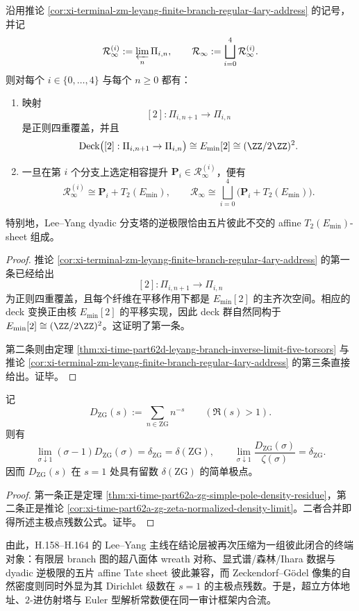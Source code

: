 \begin{theorem}\label{thm:xi-time-part62dh-leyang-branch-affine-tate-regular-cover}
沿用推论 \ref{cor:xi-terminal-zm-leyang-finite-branch-regular-4ary-address} 的记号，并记
\[
\mathcal R_\infty^{(i)}:=\varprojlim_n\Pi_{i,n},
\qquad
\mathcal R_\infty:=\bigsqcup_{i=0}^{4}\mathcal R_\infty^{(i)}.
\]
则对每个 \(i\in\{0,\dots,4\}\) 与每个 \(n\ge 0\) 都有：
\begin{enumerate}
  \item 映射
  \[
  [2]:\Pi_{i,n+1}\longrightarrow \Pi_{i,n}
  \]
  是正则四重覆盖，并且
  \[
  \operatorname{Deck}\bigl([2]:\Pi_{i,n+1}\to \Pi_{i,n}\bigr)
  \cong
  E_{\min}[2]
  \cong
  (\ZZ/2\ZZ)^2.
  \]
  \item 一旦在第 \(i\) 个分支上选定相容提升 \(\mathbf P_i\in\mathcal R_\infty^{(i)}\)，便有
  \[
  \mathcal R_\infty^{(i)}\cong \mathbf P_i+T_2(E_{\min}),
  \qquad
  \mathcal R_\infty
  \cong
  \bigsqcup_{i=0}^{4}\bigl(\mathbf P_i+T_2(E_{\min})\bigr).
  \]
\end{enumerate}
特别地，Lee--Yang dyadic 分支塔的逆极限恰由五片彼此不交的 affine \(T_2(E_{\min})\)-sheet 组成。
\end{theorem}
\begin{proof}
推论 \ref{cor:xi-terminal-zm-leyang-finite-branch-regular-4ary-address} 的第一条已经给出
\[
[2]:\Pi_{i,n+1}\to\Pi_{i,n}
\]
为正则四重覆盖，且每个纤维在平移作用下都是 \(E_{\min}[2]\) 的主齐次空间。相应的 deck 变换正由核 \(E_{\min}[2]\) 的平移实现，因此 deck 群自然同构于 \(E_{\min}[2]\cong(\ZZ/2\ZZ)^2\)。这证明了第一条。

第二条则由定理 \ref{thm:xi-time-part62d-leyang-branch-inverse-limit-five-torsors} 与推论 \ref{cor:xi-terminal-zm-leyang-finite-branch-regular-4ary-address} 的第三条直接给出。证毕。
\end{proof}

\begin{corollary}\label{cor:xi-time-part62dh-zg-dirichlet-density-residue}
记
\[
D_{\mathrm{ZG}}(s):=\sum_{n\in\mathrm{ZG}}n^{-s}
\qquad (\Re(s)>1).
\]
则有
\[
\lim_{\sigma\downarrow 1}(\sigma-1)D_{\mathrm{ZG}}(\sigma)
=
\delta_{\mathrm{ZG}}=\delta(\mathrm{ZG}),
\qquad
\lim_{\sigma\downarrow 1}\frac{D_{\mathrm{ZG}}(\sigma)}{\zeta(\sigma)}
=
\delta_{\mathrm{ZG}}.
\]
因而 \(D_{\mathrm{ZG}}(s)\) 在 \(s=1\) 处具有留数 \(\delta(\mathrm{ZG})\) 的简单极点。
\end{corollary}
\begin{proof}
第一条正是定理 \ref{thm:xi-time-part62a-zg-simple-pole-density-residue}，第二条正是推论 \ref{cor:xi-time-part62a-zg-zeta-normalized-density-limit}。二者合并即得所述主极点残数公式。证毕。
\end{proof}

\noindent
由此，H.158--H.164 的 Lee--Yang 主线在结论层被再次压缩为一组彼此闭合的终端对象：有限层 branch 图的超八面体 wreath 对称、显式谱/森林/Ihara 数据与 dyadic 逆极限的五片 affine Tate sheet 彼此兼容，而 Zeckendorf--Gödel 像集的自然密度则同时外显为其 Dirichlet 级数在 \(s=1\) 的主极点残数。于是，超立方体地址、\(2\)-进仿射塔与 Euler 型解析常数便在同一审计框架内合流。

\endinput

